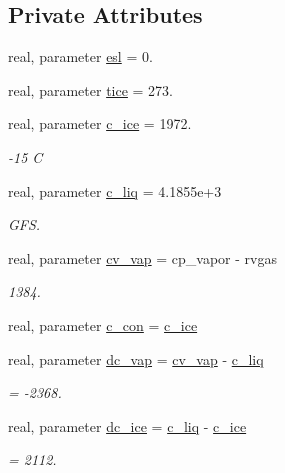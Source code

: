 \subsection*{Private Attributes}
\begin{DoxyCompactItemize}
\item 
real, parameter \hyperlink{classfv__sg__mod_af4058b7b266d23d4f30e73514cd0d403}{esl} = 0.
\item 
real, parameter \hyperlink{classfv__sg__mod_a87874cc5d80d9ea6ee4f67ae591ef080}{tice} = 273.
\item 
real, parameter \hyperlink{classfv__sg__mod_a84f3c846b418dad59c6ab9ab7987ead7}{c\-\_\-ice} = 1972.
\begin{DoxyCompactList}\small\item\em -\/15 C \end{DoxyCompactList}\item 
real, parameter \hyperlink{classfv__sg__mod_a410bbdf1e319c65ea3a200ce8aceda8a}{c\-\_\-liq} = 4.\-1855e+3
\begin{DoxyCompactList}\small\item\em G\-F\-S. \end{DoxyCompactList}\item 
real, parameter \hyperlink{classfv__sg__mod_ab4b7454109972c7d688beea157f279a1}{cv\-\_\-vap} = cp\-\_\-vapor -\/ rvgas
\begin{DoxyCompactList}\small\item\em 1384. \end{DoxyCompactList}\item 
real, parameter \hyperlink{classfv__sg__mod_a244f143b09b1f0b2dfef9acb1b4e64a7}{c\-\_\-con} = \hyperlink{classfv__sg__mod_a84f3c846b418dad59c6ab9ab7987ead7}{c\-\_\-ice}
\item 
real, parameter \hyperlink{classfv__sg__mod_a801d775ff0bd22525d3bdbfdbaa25a93}{dc\-\_\-vap} = \hyperlink{classfv__sg__mod_ab4b7454109972c7d688beea157f279a1}{cv\-\_\-vap} -\/ \hyperlink{classfv__sg__mod_a410bbdf1e319c65ea3a200ce8aceda8a}{c\-\_\-liq}
\begin{DoxyCompactList}\small\item\em = -\/2368. \end{DoxyCompactList}\item 
real, parameter \hyperlink{classfv__sg__mod_a78cb86127e174c40e9c96f9ad386cd51}{dc\-\_\-ice} = \hyperlink{classfv__sg__mod_a410bbdf1e319c65ea3a200ce8aceda8a}{c\-\_\-liq} -\/ \hyperlink{classfv__sg__mod_a84f3c846b418dad59c6ab9ab7987ead7}{c\-\_\-ice}
\begin{DoxyCompactList}\small\item\em = 2112. \end{DoxyCompactList}\item 

\end{DoxyCompactItemize}
